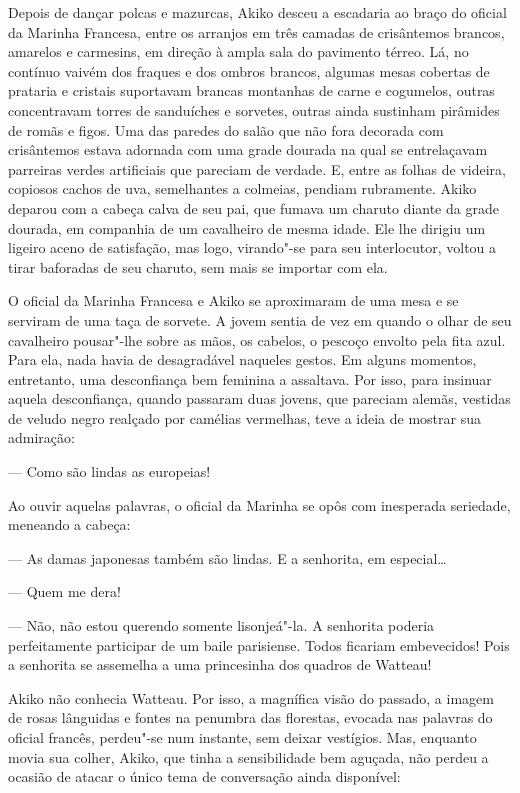 Depois de dançar polcas e mazurcas, Akiko desceu a escadaria ao braço do
oficial da Marinha Francesa, entre os arranjos em três camadas de
crisântemos brancos, amarelos e carmesins, em direção à ampla sala do
pavimento térreo. Lá, no contínuo vaivém dos fraques e dos ombros		
brancos, algumas mesas cobertas de prataria e cristais suportavam
brancas montanhas de carne e cogumelos, outras concentravam torres de
sanduíches e sorvetes, outras ainda sustinham pirâmides de romãs e
figos. Uma das paredes do salão que não fora decorada com crisântemos
estava adornada com uma grade dourada na qual se entrelaçavam parreiras
verdes artificiais que pareciam de verdade. E, entre as folhas de
videira, copiosos cachos de uva, semelhantes a colmeias, pendiam
rubramente. Akiko deparou com a cabeça calva de seu pai, que fumava um
charuto diante da grade dourada, em companhia de um cavalheiro de mesma
idade. Ele lhe dirigiu um ligeiro aceno de satisfação, mas logo,
virando"-se para seu interlocutor, voltou a tirar baforadas de seu
charuto, sem mais se importar com ela.

O oficial da Marinha Francesa e Akiko se aproximaram de uma mesa e se
serviram de uma taça de sorvete. A jovem sentia de vez em quando o
olhar de seu cavalheiro pousar"-lhe sobre as mãos, os cabelos, o pescoço
envolto pela fita azul. Para ela, nada havia de desagradável naqueles
gestos. Em alguns momentos, entretanto, uma desconfiança bem feminina a
assaltava. Por isso, para insinuar aquela desconfiança, quando passaram
duas jovens, que pareciam alemãs, vestidas de veludo negro realçado por
camélias vermelhas, teve a ideia de mostrar sua admiração:

--- Como são lindas as europeias!

Ao ouvir aquelas palavras, o oficial da Marinha se opôs com inesperada
seriedade, meneando a cabeça:

--- As damas japonesas também são lindas. E a senhorita, em especial\ldots{}

--- Quem me dera!

--- Não, não estou querendo somente lisonjeá"-la. A senhorita poderia
perfeitamente participar de um baile parisiense. Todos ficariam
embevecidos! Pois a senhorita se assemelha a uma princesinha dos quadros de Watteau!

Akiko não conhecia Watteau. Por isso, a magnífica visão do passado, a
imagem de rosas lânguidas e fontes na penumbra das florestas, evocada
nas palavras do oficial francês, perdeu"-se num instante, sem deixar
vestígios. Mas, enquanto movia sua colher, Akiko, que tinha a
sensibilidade bem aguçada, não perdeu a ocasião de atacar o único tema
de conversação ainda disponível:

